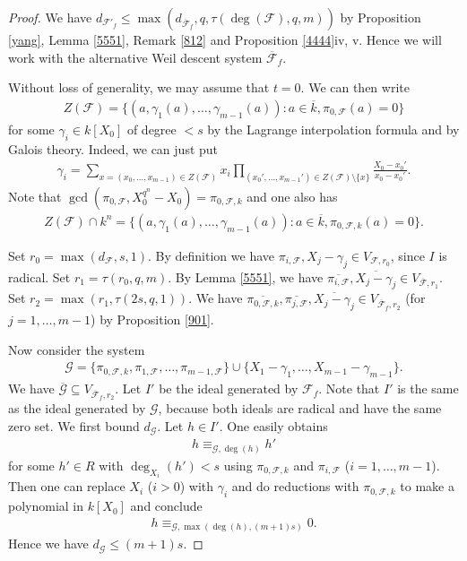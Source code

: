 \documentclass{amsart}
\theoremstyle{plain}
\theoremstyle{definition}
\begin{document}
\begin{proof}
We have $d_{\mathcal{F}'_f} \leq \max(d_{\overline{\mathcal{F}}_f},q, \tau(\deg(\mathcal{F}),q,m))$ by Proposition \ref{yang},  Lemma \ref{5551}, Remark \ref{812} and Proposition \ref{4444}iv, v. Hence we will work with the alternative Weil descent system $\overline{\mathcal{F}}_f$.

Without loss of generality, we may assume that $t=0$. We can then write
\begin{eqnarray*}
Z(\mathcal{F}) = \{(a, \gamma_1(a), \ldots,\gamma_{m-1}(a)): a \in \overline{k}, \pi_{0,\mathcal{F}}(a)=0\}
\end{eqnarray*}
for some $\gamma_i \in k[X_0]$ of degree $< s$ by the Lagrange interpolation formula and by Galois theory. Indeed, we can just put
\begin{eqnarray*}
\gamma_i = \sum_{x=(x_0,\ldots,x_{m-1}) \in Z(\mathcal{F})} x_i \prod_{(x_0',\ldots,x_{m-1}') \in Z(\mathcal{F}) \setminus \{x\}} \frac{X_0-x_0'}{x_0-x_0'}.
\end{eqnarray*}
Note that $\gcd(\pi_{0,\mathcal{F}}, X_0^{q^n}-X_0)=\pi_{0,\mathcal{F},k}$ and one also has
\begin{eqnarray*}
Z(\mathcal{F}) \cap k^n= \{(a, \gamma_1(a), \ldots,\gamma_{m-1}(a)): a \in \overline{k}, \pi_{0,\mathcal{F},k}(a)=0 \}.
\end{eqnarray*}

Set $r_0=\max(d_{\mathcal{F}},s,1)$. By definition we have $\pi_{i,\mathcal{F}}, X_j-\gamma_j \in V_{\mathcal{F},r_0}$, since $I$ is radical. Set $r_1=\tau(r_0,q,m)$. By Lemma \ref{5551}, we have $\overline{\pi_{i,\mathcal{F}}}, \overline{X_j-\gamma_j} \in  V_{\overline{\mathcal{F}}, r_1}$.
Set $r_2=\max(r_1,\tau(2s,q,1))$. We have $\overline{\pi_{0,\mathcal{F},k}},\overline{\pi_{j,\mathcal{F}}}, \overline{X_j-\gamma_j} \in V_{\overline{\mathcal{F}}_f, r_2}$ (for $j=1,\ldots,m-1$) by Proposition \ref{901}.

Now consider the system
\begin{eqnarray*}
\mathcal{G} = \{\pi_{0,\mathcal{F},k}, \pi_{1,\mathcal{F}}, \ldots,\pi_{m-1,\mathcal{F}}\} \cup \{X_1-\gamma_1,\ldots,X_{m-1}-\gamma_{m-1}\}.
\end{eqnarray*}
We have $\overline{\mathcal{G}} \subseteq V_{\overline{\mathcal{F}}_f, r_2}$.
Let $I'$ be the ideal generated by $\mathcal{F}_f$. Note that $I'$ is the same as the ideal generated by $\mathcal{G}$, because both ideals are radical and have the same zero set. We first bound $d_{\mathcal{G}}$. Let $h \in I'$. One easily obtains
\begin{eqnarray*}
h \equiv_{\mathcal{G},\deg(h)} h' 
\end{eqnarray*}
for some $h' \in R$ with $\deg_{X_i}(h') <s$ using $\pi_{0,\mathcal{F},k}$ and $\pi_{i,\mathcal{F}}$ ($i=1,\ldots,m-1$). Then one can replace $X_i$ ($i>0$) with $\gamma_i$ and do reductions with $\pi_{0,\mathcal{F},k}$ to make a polynomial in $k[X_0]$ and conclude
\begin{eqnarray*}
h \equiv_{\mathcal{G}, \max(\deg(h),(m+1)s)} 0.
\end{eqnarray*}
Hence we have $d_{\mathcal{G}} \leq (m+1)s$. 


\end{proof}
\end{document}
